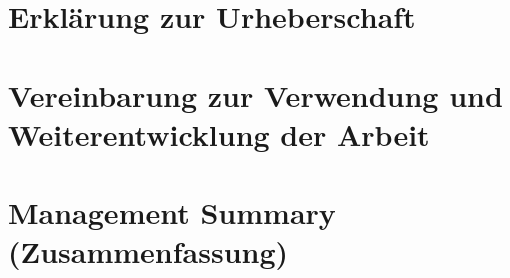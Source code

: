 \documentclass[12pt, a4paper]{report}
\begin{document}
	
	
	
	\chapter{Erklärung zur Urheberschaft}
	
	
	
	
	\chapter{Vereinbarung zur Verwendung und Weiterentwicklung der Arbeit}
	
	
	
	\chapter{Management Summary (Zusammenfassung)}
	
	
	
	
	
	
	
	
\end{document}

